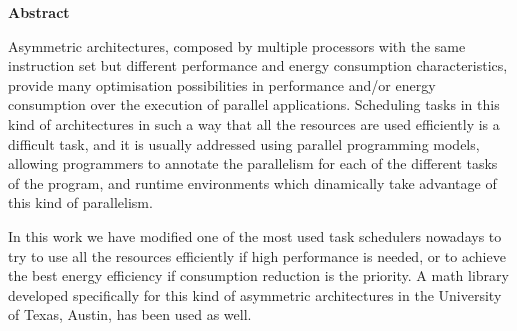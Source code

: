 
\cleardoublepage

\thispagestyle{empty}

\begin{center}

{\bf \Huge Abstract}

  \end{center}
\vspace{1cm}

Asymmetric architectures, composed by multiple processors with the same
instruction set but different performance and energy consumption
characteristics, provide many optimisation possibilities in performance
and/or energy consumption over the execution of parallel
applications. Scheduling tasks in this kind of architectures in such a way
that all the resources are used efficiently is a difficult task, and it is
usually addressed using parallel programming models, allowing programmers
to annotate the parallelism for each of the different tasks of
the program, and runtime environments which dinamically take advantage of
this kind of parallelism.



In this work we have modified one of the most used task schedulers nowadays
to try to use all the resources efficiently if high performance is needed,
or to achieve the best energy efficiency if consumption reduction is the
priority. A math library developed specifically for this kind of asymmetric
architectures in the University of Texas, Austin, has been used as well.



